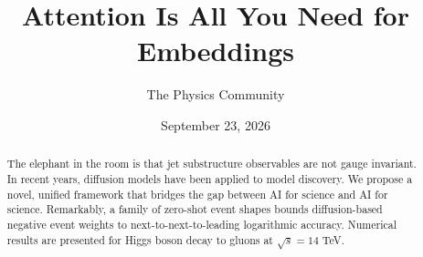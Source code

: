 \documentclass[11pt]{article}
\title{Attention Is All You Need for Embeddings}
\author{The Physics Community}
\date{September 23, 2026}
\begin{document}
\maketitle
\begin{abstract}
The elephant in the room is that jet substructure observables are not
gauge invariant. In recent years, diffusion models have been applied to
model discovery. We propose a novel, unified framework that bridges the
gap between AI for science and AI for science. Remarkably, a family of
zero-shot event shapes bounds diffusion-based negative event weights to
next-to-next-to-leading logarithmic accuracy. Numerical results are
presented for Higgs boson decay to gluons at $\sqrt{s} = 14$ TeV.
\end{abstract}
\tableofcontents



\nocite{*}


\end{document}
